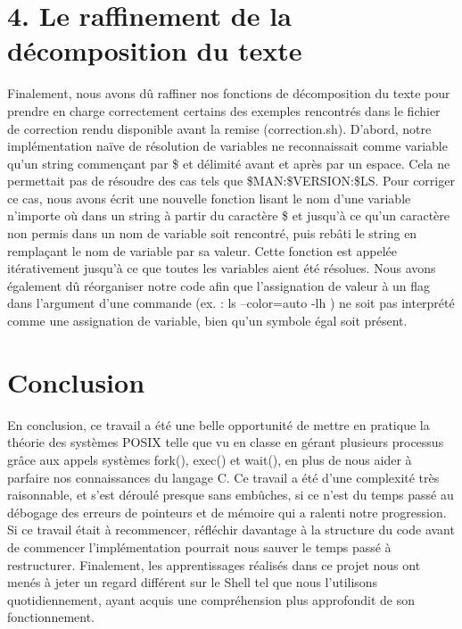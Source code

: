 \documentclass{article}
\begin{document}
\section*{ 4. Le raffinement de la décomposition du texte }
Finalement, nous avons dû raffiner nos fonctions de décomposition du texte pour prendre en charge correctement certains des exemples rencontrés dans le fichier de correction rendu disponible avant la remise (correction.sh). 
D’abord, notre implémentation naïve de résolution de variables ne reconnaissait comme variable qu’un string commençant par \$ et délimité avant et après par un espace. Cela ne permettait pas de résoudre des cas tels que \$MAN:\$VERSION:\$LS. Pour corriger ce cas, nous avons écrit une nouvelle fonction lisant le nom d’une variable n’importe où dans un string à partir du caractère \$ et jusqu’à ce qu’un caractère non permis dans un nom de variable soit rencontré, puis rebâti le string en remplaçant le nom de variable par sa valeur. Cette fonction est appelée itérativement jusqu’à ce que toutes les variables aient été résolues.
Nous avons également dû réorganiser notre code afin que l’assignation de valeur à un flag dans l’argument d’une commande (ex. : ls --color=auto -lh ) ne soit pas interprété comme une assignation de variable, bien qu’un symbole égal soit présent. 

\section*{ Conclusion }
En conclusion, ce travail a été une belle opportunité de mettre en pratique la théorie des systèmes POSIX telle que vu en classe en gérant plusieurs processus grâce aux appels systèmes fork(), exec() et wait(), en plus de nous aider à parfaire nos connaissances du langage C. Ce travail a été d’une complexité très raisonnable, et s’est déroulé presque sans embûches, si ce n’est du temps passé au débogage des erreurs de pointeurs et de mémoire qui a ralenti notre progression.  Si ce travail était à recommencer, réfléchir davantage à la structure du code avant de commencer l’implémentation pourrait nous sauver le temps passé à restructurer.  Finalement, les apprentissages réalisés dans ce projet nous ont menés à jeter un regard différent sur le Shell tel que nous l’utilisons quotidiennement, ayant acquis une compréhension plus approfondit de son fonctionnement.
\end{document}
